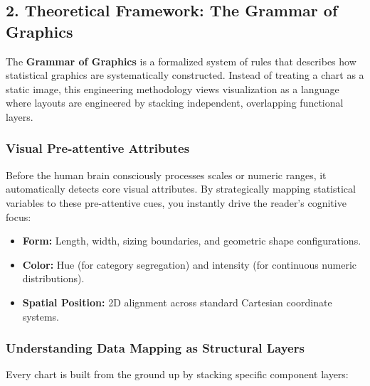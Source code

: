 \documentclass[
]{article}
\providecommand{\tightlist}{%
  \setlength{\itemsep}{0pt}\setlength{\parskip}{0pt}}
\begin{document}
\subsection{2. Theoretical Framework: The Grammar of
Graphics}\label{theoretical-framework-the-grammar-of-graphics}

The \textbf{Grammar of Graphics} is a formalized system of rules that
describes how statistical graphics are systematically constructed.
Instead of treating a chart as a static image, this engineering
methodology views visualization as a language where layouts are
engineered by stacking independent, overlapping functional layers.

\subsubsection{Visual Pre-attentive
Attributes}\label{visual-pre-attentive-attributes}

Before the human brain consciously processes scales or numeric ranges,
it automatically detects core visual attributes. By strategically
mapping statistical variables to these pre-attentive cues, you instantly
drive the reader's cognitive focus:

\begin{itemize}
\tightlist
\item
  \textbf{Form:} Length, width, sizing boundaries, and geometric shape
  configurations.
\item
  \textbf{Color:} Hue (for category segregation) and intensity (for
  continuous numeric distributions).
\item
  \textbf{Spatial Position:} 2D alignment across standard Cartesian
  coordinate systems.
\end{itemize}

\subsubsection{Understanding Data Mapping as Structural
Layers}\label{understanding-data-mapping-as-structural-layers}

Every chart is built from the ground up by stacking specific component
layers:
\end{document}
